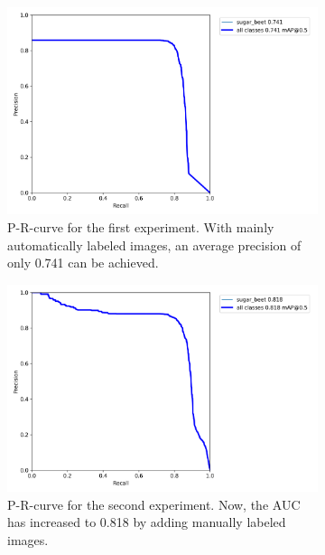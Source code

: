 \begin{figure}[htb!]
	\begin{subfigure}{.5\textwidth}
		\centering
		\includegraphics[scale=0.08]{figures/exp1_curve.png}
		\caption{P-R-curve for the first experiment. With mainly automatically labeled images, an average precision of only 0.741 can be achieved.}
		\label{fig:AUC_1}
	\end{subfigure}%
	\begin{subfigure}{.5\textwidth}
		\centering
		\includegraphics[scale=0.08]{figures/no_pre_low_dat.png}
		\caption{P-R-curve for the second experiment. Now, the AUC has increased to 0.818 by adding manually labeled images. }
		\label{fig:AUC_2}
	\end{subfigure}
	\begin{subfigure}{.5\textwidth}
		\centering

\end{subfigure}
\end{figure}
